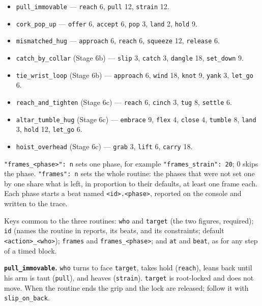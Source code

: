\documentclass[
  12pt,
  letterpaper,
]{book}
\providecommand{\tightlist}{%
  \setlength{\itemsep}{0pt}\setlength{\parskip}{0pt}}
\begin{document}
\begin{itemize}
\tightlist
\item
  \texttt{pull\_immovable} --- \texttt{reach} 6, \texttt{pull} 12,
  \texttt{strain} 12.
\item
  \texttt{cork\_pop\_up} --- \texttt{offer} 6, \texttt{accept} 6,
  \texttt{pop} 3, \texttt{land} 2, \texttt{hold} 9.
\item
  \texttt{mismatched\_hug} --- \texttt{approach} 6, \texttt{reach} 6,
  \texttt{squeeze} 12, \texttt{release} 6.
\item
  \texttt{catch\_by\_collar} (Stage 6b) --- \texttt{slip} 3,
  \texttt{catch} 3, \texttt{dangle} 18, \texttt{set\_down} 9.
\item
  \texttt{tie\_wrist\_loop} (Stage 6b) --- \texttt{approach} 6,
  \texttt{wind} 18, \texttt{knot} 9, \texttt{yank} 3, \texttt{let\_go} 6.
\item
  \texttt{reach\_and\_tighten} (Stage 6c) --- \texttt{reach} 6,
  \texttt{cinch} 3, \texttt{tug} 8, \texttt{settle} 6.
\item
  \texttt{altar\_tumble\_hug} (Stage 6c) --- \texttt{embrace} 9,
  \texttt{flex} 4, \texttt{close} 4, \texttt{tumble} 8, \texttt{land} 3,
  \texttt{hold} 12, \texttt{let\_go} 6.
\item
  \texttt{hoist\_overhead} (Stage 6c) --- \texttt{grab} 3,
  \texttt{lift} 6, \texttt{carry} 18.
\end{itemize}

\texttt{"frames\_<phase>": n} sets one phase, for example
\texttt{"frames\_strain": 20}; 0 skips the phase. \texttt{"frames": n}
sets the whole routine: the phases that were not set one by one share
what is left, in proportion to their defaults, at least one frame each.
Each phase starts a beat named \texttt{<id>.<phase>}, reported on the
console and written to the trace.

Keys common to the three routines: \texttt{who} and \texttt{target}
(the two figures, required); \texttt{id} (names the routine in reports,
its beats, and its constraints; default \texttt{<action>\_<who>});
\texttt{frames} and \texttt{frames\_<phase>}; and \texttt{at} and
\texttt{beat}, as for any step of a timed block.

\textbf{\texttt{pull\_immovable}.} \texttt{who} turns to face
\texttt{target}, takes hold (\texttt{reach}), leans back until his arm
is taut (\texttt{pull}), and heaves (\texttt{strain}). \texttt{target}
is root-locked and does not move. When the routine ends the grip and
the lock are released; follow it with \texttt{slip\_on\_back}.
\end{document}
